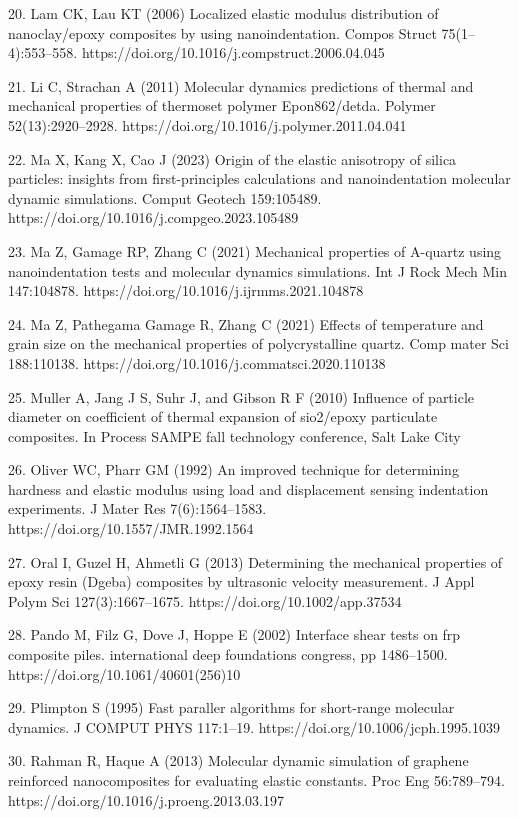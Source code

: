 \documentclass{article}
\begin{document}
\begin{hangpars}
20. Lam CK, Lau KT (2006) Localized elastic modulus distribution of nanoclay/epoxy composites by using nanoindentation. Compos Struct 75(1–4):553–558. https://doi.org/10.1016/j.compstruct.2006.04.045

21. Li C, Strachan A (2011) Molecular dynamics predictions of thermal and mechanical properties of thermoset polymer Epon862/detda. Polymer 52(13):2920–2928. https://doi.org/10.1016/j.polymer.2011.04.041

22. Ma X, Kang X, Cao J (2023) Origin of the elastic anisotropy of silica particles: insights from first-principles calculations and nanoindentation molecular dynamic simulations. Comput Geotech 159:105489. https://doi.org/10.1016/j.compgeo.2023.105489

23. Ma Z, Gamage RP, Zhang C (2021) Mechanical properties of A-quartz using nanoindentation tests and molecular dynamics simulations. Int J Rock Mech Min 147:104878. https://doi.org/10.1016/j.ijrmms.2021.104878

24. Ma Z, Pathegama Gamage R, Zhang C (2021) Effects of temperature and grain size on the mechanical properties of polycrystalline quartz. Comp mater Sci 188:110138. https://doi.org/10.1016/j.commatsci.2020.110138

25. Muller A, Jang J S, Suhr J, and Gibson R F (2010) Influence of particle diameter on coefficient of thermal expansion of sio2/epoxy particulate composites. In Process SAMPE fall technology conference, Salt Lake City

26. Oliver WC, Pharr GM (1992) An improved technique for determining hardness and elastic modulus using load and displacement sensing indentation experiments. J Mater Res 7(6):1564–1583. https://doi.org/10.1557/JMR.1992.1564

27. Oral I, Guzel H, Ahmetli G (2013) Determining the mechanical properties of epoxy resin (Dgeba) composites by ultrasonic velocity measurement. J Appl Polym Sci 127(3):1667–1675. https://doi.org/10.1002/app.37534

28. Pando M, Filz G, Dove J, Hoppe E (2002) Interface shear tests on frp composite piles. international deep foundations congress, pp 1486–1500. https://doi.org/10.1061/40601(256)10

29. Plimpton S (1995) Fast paraller algorithms for short-range molecular dynamics. J COMPUT PHYS 117:1–19. https://doi.org/10.1006/jcph.1995.1039

30. Rahman R, Haque A (2013) Molecular dynamic simulation of graphene reinforced nanocomposites for evaluating elastic constants. Proc Eng 56:789–794. https://doi.org/10.1016/j.proeng.2013.03.197


\end{hangpars}
\end{document}
